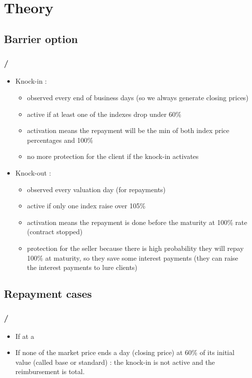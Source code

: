 \section{Theory}

\subsection{Barrier option}
\begin{frame}
\frametitle{\insertsection / \small{\insertsubsection}}
\begin{itemize}
	\item Knock-in :
	\begin{itemize}
		\item observed every end of business days (so we always generate closing prices)
		\item active if at least one of the indexes drop under 60\%
		\item activation means the repayment will be the min of both index price percentages and 100\%
		\item no more protection for the client if the knock-in activates
	\end{itemize}
	\item Knock-out :
	\begin{itemize}
		\item observed every valuation day (for repayments) 
		\item active if only one index raise over 105\%
		\item activation means the repayment is done before the maturity at 100\% rate (contract stopped)
		\item protection for the seller because there is high probability they will repay 100\% at maturity, so they save some interest payments (they can raise the interest payments to lure clients)
	\end{itemize}
\end{itemize}

\subsection{Repayment cases}
\begin{frame}
\frametitle{\insertsection / \insertsubsection}
\begin{itemize}
	\item If at a 
	\item If none of the market price ends a day (closing price) at 60\% of its initial value (called base or standard) : the knock-in is not active and the reimbursement is total.
\end{itemize}


\end{frame}
\end{frame}
